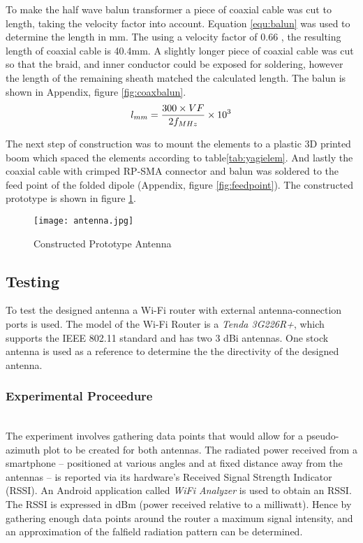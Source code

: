 \documentclass[10pt,twocolumn,hidelinks]{witseiepaper}
\begin{document}
To make the half wave balun transformer a piece of coaxial cable was cut to
length, taking the velocity factor into account. Equation \ref{equ:balun}
was used to determine the length in mm. The using a velocity factor of 0.66
\cite{rg174}, the resulting length of coaxial cable is 40.4mm. A slightly
longer piece of coaxial cable was cut so that the braid, and inner
conductor could be exposed for soldering, however the length of the
remaining sheath matched the calculated length. The balun is shown in
Appendix, figure \ref{fig:coaxbalun}.
\vspace{-0.1cm}
\begin{equation}
    \label{equ:balun}
    l_{mm}=\frac{300 \times VF}{2f_{MHz} } \times 10^3
    \vspace{-0.25cm}
\end{equation}

The next step of construction was to mount the elements to a plastic 3D
printed boom which spaced the elements according to
table\ref{tab:yagielem}. And lastly the coaxial cable with crimped RP-SMA
connector and balun was soldered to the feed point of the folded dipole
(Appendix, figure \ref{fig:feedpoint}). The constructed prototype is shown
in figure \ref{fig:prototype}.

\begin{figure}
    \texttt{[image: antenna.jpg]}
    \caption{Constructed Prototype Antenna}
    \label{fig:prototype}
    \vspace{-0.35cm}
\end{figure}

\subsection{Testing}
To test the designed antenna a Wi-Fi router with external
antenna-connection ports is used. The model of the Wi-Fi Router is a
\textit{Tenda 3G226R+}, which supports the IEEE 802.11 standard and has two
3 dBi antennas\cite{tenda}. One stock antenna is used as a reference to
determine the the directivity of the designed antenna.

\subsubsection{Experimental Proceedure}~\\
\label{expproc}
The experiment involves gathering data points that would allow for a
pseudo-azimuth plot to be created for both antennas. The radiated power
received from a smartphone -- positioned at various angles and at fixed
distance away from the antennas -- is reported via its hardware's Received
Signal Strength Indicator (RSSI). An Android application called
\textit{WiFi Analyzer} \cite{wifianalyzer} is used to obtain an RSSI. The
RSSI is expressed in dBm (power received relative to a milliwatt). Hence by
gathering enough data points around the router a maximum signal intensity,
and an approximation of the falfield radiation pattern can be determined.
\end{document}
